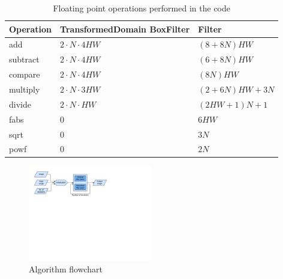 \begin{table}[h]
\label{cost_analysis}
\centering
{\small
\begin{tabular}{| l | p{3cm} | p{3cm} |} \hline 
Operation & TransformedDomain BoxFilter  & Filter \\ \hline
add & $2 \cdot N \cdot 4HW$ & $(8 + 8N)HW$ \\ \hline
subtract & $2 \cdot N \cdot 4HW$ & $(6 + 8N)HW$ \\ \hline
compare & $2 \cdot  N \cdot 4HW$ & $(8N)HW$ \\ \hline
multiply & $2 \cdot N \cdot 3HW$ & $(2 + 6N)HW + 3N$ \\ \hline
divide & $2 \cdot N \cdot HW$ & $(2HW + 1)N + 1$ \\ \hline
fabs & $0$ & $6HW$ \\ \hline
sqrt & $0$ & $3N$ \\ \hline
powf  & $0$ & $2N$ \\ \hline
\end{tabular}}
\caption{Floating point operations performed in the code}
\end{table}

\begin{figure}\vspace{-1mm}
  \includegraphics[trim=10mm 145mm 100mm 10mm, clip, width=0.48\textwidth]{figures/flowchart.pdf}
  \caption{Algorithm flowchart\label{flowchart}}
\end{figure}

